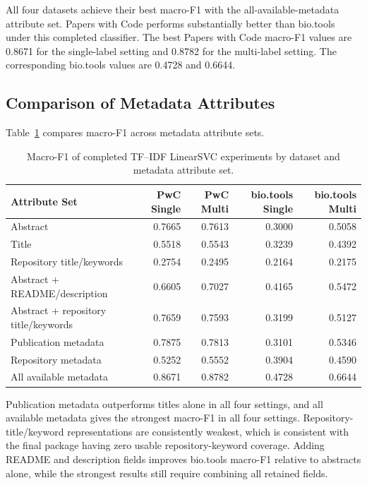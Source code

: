 \documentclass[pdflatex,sn-mathphys-num]{sn-jnl}%
\theoremstyle{thmstyleone}%
\theoremstyle{thmstyletwo}%
\theoremstyle{thmstylethree}%
\begin{document}
All four datasets achieve their best macro-F1 with the all-available-metadata attribute set. Papers with Code performs substantially better than bio.tools under this completed classifier. The best Papers with Code macro-F1 values are 0.8671 for the single-label setting and 0.8782 for the multi-label setting. The corresponding bio.tools values are 0.4728 and 0.6644.

\subsection{Comparison of Metadata Attributes}
\label{subsec:classification-attributes}

Table~\ref{tab:classification-attribute-comparison} compares macro-F1 across metadata attribute sets.

\begin{table}[htbp]
\centering
\scriptsize
\caption{Macro-F1 of completed TF--IDF LinearSVC experiments by dataset and metadata attribute set.}
\label{tab:classification-attribute-comparison}
\setlength{\tabcolsep}{3pt}
\begin{tabular}{lrrrr}
\toprule
Attribute Set & PwC Single & PwC Multi & bio.tools Single & bio.tools Multi \\
\midrule
Abstract & 0.7665 & 0.7613 & 0.3000 & 0.5058 \\
Title & 0.5518 & 0.5543 & 0.3239 & 0.4392 \\
Repository title/keywords & 0.2754 & 0.2495 & 0.2164 & 0.2175 \\
Abstract + README/description & 0.6605 & 0.7027 & 0.4165 & 0.5472 \\
Abstract + repository title/keywords & 0.7659 & 0.7593 & 0.3199 & 0.5127 \\
Publication metadata & 0.7875 & 0.7813 & 0.3101 & 0.5346 \\
Repository metadata & 0.5252 & 0.5552 & 0.3904 & 0.4590 \\
All available metadata & 0.8671 & 0.8782 & 0.4728 & 0.6644 \\
\bottomrule
\end{tabular}
\end{table}

Publication metadata outperforms titles alone in all four settings, and all available metadata gives the strongest macro-F1 in all four settings. Repository-title/keyword representations are consistently weakest, which is consistent with the final package having zero usable repository-keyword coverage. Adding README and description fields improves bio.tools macro-F1 relative to abstracts alone, while the strongest results still require combining all retained fields.
\end{document}
